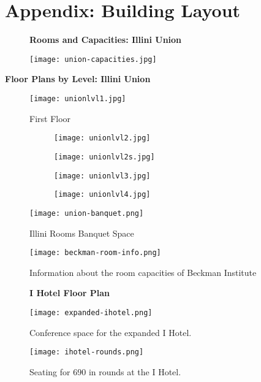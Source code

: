 \section{Appendix: Building Layout}
\label{appendix:building}
\begin{figure}[H]
	\centering
	\textbf{Rooms and Capacities: Illini Union} \par\medskip
	\texttt{[image: union-capacities.jpg]}
\end{figure}

\newpage
{\centering\textbf{Floor Plans by Level: Illini Union} \par\medskip}
\begin{figure}[H]
	\centering
	\texttt{[image: unionlvl1.jpg]}
	\caption{First Floor}
\end{figure}

\begin{figure}[H]
	\centering
	\begin{subfigure}{0.5\textwidth}
		\centering
		\texttt{[image: unionlvl2.jpg]}
	\end{subfigure}%
	\begin{subfigure}{0.5\textwidth}
		\centering
		\texttt{[image: unionlvl2s.jpg]}
	\end{subfigure}
	\begin{subfigure}{0.5\textwidth}
		\centering
		\texttt{[image: unionlvl3.jpg]}
	\end{subfigure}%
	\begin{subfigure}{0.5\textwidth}
		\centering
		\texttt{[image: unionlvl4.jpg]}
	\end{subfigure}		
\end{figure}

\begin{figure}
	\centering
	\texttt{[image: union-banquet.png]}
	\caption{Illini Rooms Banquet Space}
\end{figure}

\begin{figure}
	\centering
	\texttt{[image: beckman-room-info.png]}
	\caption{Information about the room capacities of Beckman Institute}
\end{figure}

\vspace{1cm}
\begin{figure}[H]
	\centering
	\textbf{I Hotel Floor Plan} \par\medskip
	\texttt{[image: expanded-ihotel.png]}
	\caption{Conference space for the expanded I Hotel.}
\end{figure}
\begin{figure}[H]
	\centering
	\texttt{[image: ihotel-rounds.png]}
	\caption{Seating for 690 in rounds at the I Hotel.}
\end{figure}
% 
